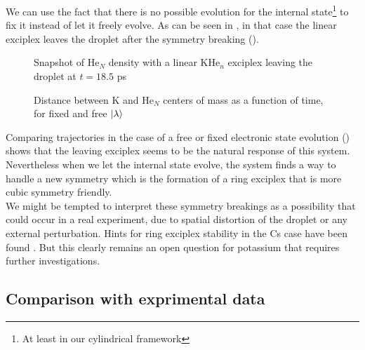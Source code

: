 We can use the fact that there is no possible evolution for the internal state\footnote{At least in our cylindrical framework} to fix it instead of let it freely evolve. 
As can be seen in , in that case the linear exciplex leaves the droplet after the symmetry breaking ().

\begin{figure}[h!]
\centering
	\begin{minipage}[c]{0.48\linewidth}
		\caption{Snapshot of He$_N$ density with a linear KHe$_n$ exciplex leaving the droplet at $t=18.5$ ps\label{fig:4P-p32-fx-snap}}
	\end{minipage}
\hfill
	\begin{minipage}[c]{0.48\linewidth}
		
		\vspace{0.2\baselineskip}
		\caption{Distance between K and He$_N$ centers of mass as a function of time, for fixed and free $\ket{\lambda}$\label{fig:4P-p32-fxd-pos}}
	\end{minipage}
\end{figure}

Comparing trajectories in the case of a free or fixed electronic state evolution () shows that the leaving exciplex seems to be the natural response of this system. 
Nevertheless when we let the internal state evolve, the system finds a way to handle a new symmetry which is the formation of a ring exciplex that is more cubic symmetry friendly.\\

We might be tempted to interpret these symmetry breakings as a possibility that could occur in a real experiment, due to spatial distortion of the droplet or any external perturbation. 
Hints for ring exciplex stability in the Cs case have been found \cite{Zbi2005}.
But this clearly remains an open question for potassium that requires further investigations.

\subsection{Comparison with exprimental data}

